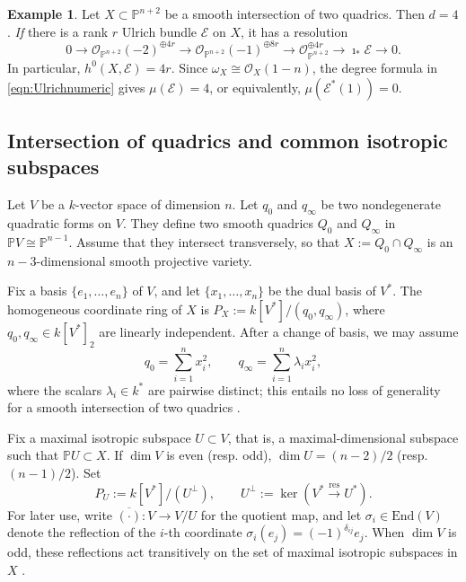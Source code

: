 \documentclass[12pt, letterpaper]{amsart}
\theoremstyle{definition}
\newtheorem{example}[theorem]{Example}
\newcommand{\PP}{\mathbb{P} }
\newcommand{\cE}{\mathcal{E} }
\newcommand{\cO}{\mathcal{O} }
\def\rEnd{\mathrm{End} }
\begin{document}
\begin{example}\label{ex:intquadrics}
Let \(X\subset\PP^{n+2}\) be a smooth intersection of two quadrics. Then \(d=4\). \textit{If} there is a rank \(r\) Ulrich bundle \(\cE\) on \(X\), it has a resolution
\[0\to \cO_{\PP^{n+2}}(-2)^{\oplus 4r} \to \cO_{\PP^{n+2}}(-1)^{\oplus 8r} \to \cO_{\PP^{n+2}}^{\oplus 4r} \to \imath_*\cE\to 0.\]
In particular, \(h^0(X,\cE)=4r\). Since \(\omega_X\cong\cO_X(1-n)\), the degree formula in \eqref{eqn:Ulrichnumeric} gives \(\mu(\cE)=4\), or equivalently, \(\mu(\cE^*(1))=0\).
\end{example}

\subsection{Intersection of quadrics and common isotropic subspaces}\label{ssec:isotropicspace}

Let \(V\) be a \(k\)-vector space of dimension \(n\). Let \(q_0\) and \(q_\infty\) be two nondegenerate quadratic forms on \(V\). They define two smooth quadrics \(Q_0\) and \(Q_\infty\) in \(\PP V \cong \PP^{n-1}\). Assume that they intersect transversely, so that \(X := Q_0 \cap Q_\infty\) is an \(n-3\)-dimensional smooth projective variety.

Fix a basis \(\{e_1,\ldots,e_{n}\}\) of \(V\), and let \(\{x_1,\ldots,x_{n}\}\) be the dual basis of \(V^*\). The homogeneous coordinate ring of \(X\) is \(P_X:=k[V^*]/(q_0,q_\infty)\), where \(q_0,q_\infty\in k[V^*]_2\) are linearly independent. After a change of basis, we may assume
\begin{equation}\label{eqn:quadforms}
q_0=\sum_{i=1}^{n}x_i^2,\qquad q_\infty=\sum_{i=1}^{n}\lambda_i x_i^2,
\end{equation}
where the scalars \(\lambda_i\in k^*\) are pairwise distinct; this entails no loss of generality for a smooth intersection of two quadrics \cite[Proposition~2.1]{Rei73}.

Fix a maximal isotropic subspace \(U\subset V\), that is, a maximal-dimensional subspace such that \(\PP U\subset X\). If \(\dim V\) is even (resp. odd), \(\dim U = (n-2)/2\) (resp. \((n-1)/2\)). Set
\begin{equation}\label{def:PU}
P_U:=k[V^*]/(U^\perp),\qquad U^\perp:=\ker(V^*\xrightarrow{\mathrm{res}}U^*).
\end{equation}
For later use, write \(\overline{(\cdot)}:V\to V/U\) for the quotient map, and let \(\sigma_i \in \rEnd(V)\) denote the reflection of the \(i\)-th coordinate \(\sigma_i(e_j) = (-1)^{\delta_{ij}}e_j\). When \(\dim V\) is odd, these reflections act transitively on the set of maximal isotropic subspaces in \(X\) \cite[Theorem~3.8]{Rei73}.
\end{document}
